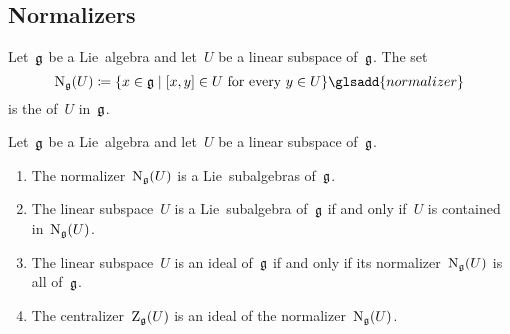 \subsection{Normalizers}


\begin{definition}
	Let~$\mathfrak{g}$ be a Lie~algebra and let~$U$ be a linear subspace of~$\mathfrak{g}$.
	The set
	\[
		\normallie_{\glie}(U)
		\defined
		\{
			x \in \glie
		\suchthat
			\text{$[x,y] \in U$ for every~$y \in U$}
		\}
		\glsadd{normalizer}
	\]
	is the  of~$U$ in~$\mathfrak{g}$.
\end{definition}


\begin{proposition}
	Let~$\mathfrak{g}$ be a Lie~algebra and let~$U$ be a linear subspace of~$\mathfrak{g}$.
	\begin{enumerate}
		\item
			The normalizer~$\operatorname{N}_{\mathfrak{g}}(U)$ is a Lie~subalgebras of~$\mathfrak{g}$.
		\item
			The linear subspace~$U$ is a Lie~subalgebra of~$\mathfrak{g}$ if and only if~$U$ is contained in~$\operatorname{N}_{\mathfrak{g}}(U)$.
		\item
			The linear subspace~$U$ is an ideal of~$\mathfrak{g}$ if and only if its normalizer~$\operatorname{N}_{\mathfrak{g}}(U)$ is all of~$\mathfrak{g}$.
		\item
			The centralizer~$\operatorname{Z}_{\mathfrak{g}}(U)$ is an ideal of the normalizer~$\operatorname{N}_{\mathfrak{g}}(U)$.
	\end{enumerate}
\end{proposition}


